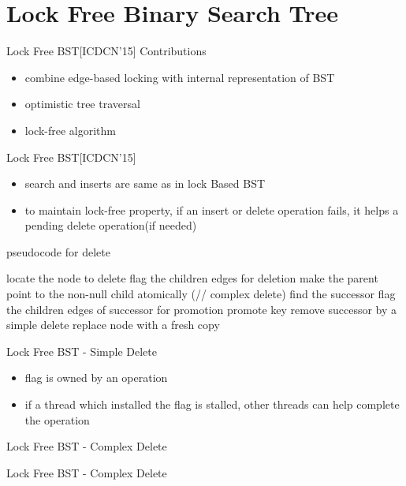 \documentclass{beamer}
\begin{document}
\section{Lock Free Binary Search Tree}
\begin{frame}[c]{Lock Free BST[ICDCN'15]}
Contributions
\begin{itemize}
\item combine edge-based locking with internal representation of BST 
\item optimistic tree traversal 
\pause
\item lock-free algorithm
\end{itemize}
\end{frame}

\begin{frame}{Lock Free BST[ICDCN'15]}
\begin{itemize}
\item search and inserts are same as in lock Based BST
\item to maintain lock-free property, if an insert or delete operation fails, it helps a pending delete operation(if needed)
\end{itemize} 
pseudocode for delete
\begin{algorithm}[H]
locate the node to delete\;
flag the children edges for deletion\;
{
make the parent point to the non-null child atomically\;
}
\Else(// complex delete)
{
find the successor\;
flag the children edges of successor for promotion\;
promote key\;
remove successor by a simple delete\;
replace node with a fresh copy\;
}
\end{algorithm}
\end{frame}

\begin{frame}[c]{Lock Free BST - Simple Delete}
\begin{itemize}
\item flag is owned by an operation
\item if a thread which installed the flag is stalled, other threads can help complete the operation
\end{itemize}
\pause

\end{frame}

\begin{frame}[c]{Lock Free BST - Complex Delete}

\end{frame}
\begin{frame}[c]{Lock Free BST - Complex Delete}

\end{frame}
\end{document}
